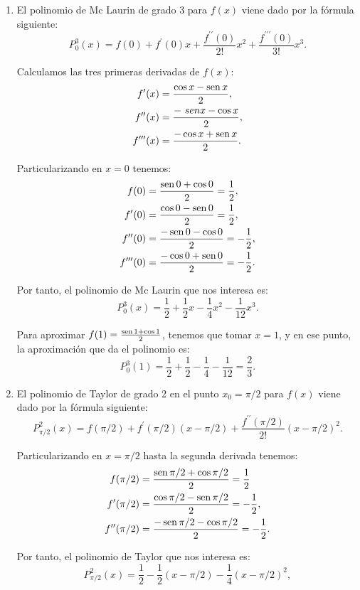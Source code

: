 {\begin{enumerate}
\item  El polinomio de Mc Laurin de grado 3 para $f(x)$ viene dado por la fórmula siguiente: 
\[
P_0^3(x)=f(0)+f^{\prime }(0)x+\frac{f^{\prime \prime }(0)}{2!}x^2+\frac{f^{\prime \prime \prime }(0)}{3!}x^3. 
\]

Calculamos las tres primeras derivadas de $f(x)$: 
\begin{align*}
f^{\prime }(x) &= \frac{\cos x-\operatorname{sen} x}{2}, \\
f^{\prime \prime }(x) &= \frac{-\ sen x-\cos x}{2}, \\
f^{\prime \prime \prime }(x) &= \frac{-\cos x+\operatorname{sen} x}{2}.
\end{align*}

Particularizando en $x=0$ tenemos: 
\begin{align*}
f(0) &= \frac{\operatorname{sen} 0+\cos 0}2=\frac{1}{2}, \\
f^{\prime }(0) &= \frac{\cos 0-\operatorname{sen} 0}{2}=\frac{1}{2}, \\
f^{\prime \prime }(0) &= \frac{-\operatorname{sen} 0-\cos 0}{2}=-\frac{1}{2}, \\
f^{\prime \prime \prime }(0) &= \frac{-\cos 0+\operatorname{sen} 0}{2}=-\frac{1}{2}.
\end{align*}

Por tanto, el polinomio de Mc Laurin que nos interesa es: 
\[
P_0^3(x)=\frac{1}{2}+\frac{1}{2}x-\frac{1}{4}x^2-\frac{1}{12}x^3.
\]

Para aproximar $f(1)=\frac{\operatorname{sen} 1+\cos 1}{2}$, tenemos que tomar $x=1$, y en ese punto, la aproximación que da el polinomio es: 
\[
P_0^3(1)=\frac{1}{2}+\frac{1}{2}-\frac{1}{4}-\frac{1}{12}=\frac{2}{3}.
\]

\item  El polinomio de Taylor de grado 2 en el punto $x_0=\pi/2$ para $f(x)$ viene dado por la fórmula siguiente: 
\[
P_{\pi /2}^2(x)=f(\pi /2)+f^{\prime }(\pi /2)(x-\pi /2)+\frac{f^{\prime\prime }(\pi /2)}{2!}(x-\pi /2)^2. 
\]

Particularizando en $x=\pi/2$ hasta la segunda derivada tenemos: 
\begin{align*}
f(\pi /2) &= \frac{\operatorname{sen}\pi/2+\cos \pi /2}{2} = \frac{1}{2} \\
f^{\prime }(\pi/2) &= \frac{\cos \pi /2-\operatorname{sen}\pi/2}{2} = -\frac{1}{2}, \\
f^{\prime \prime}(\pi/2) &= \frac{-\operatorname{sen}\pi/2-\cos\pi/2}{2} = -\frac{1}{2}.
\end{align*}

Por tanto, el polinomio de Taylor que nos interesa es: 
\[
P_{\pi/2}^2(x)=\frac{1}{2}-\frac{1}{2}(x-\pi/2)-\frac{1}{4}(x-\pi/2)^2, 
\]


\end{enumerate}}
